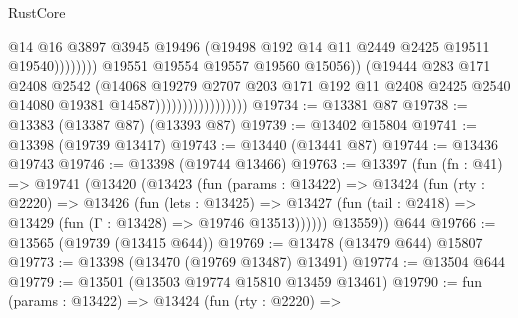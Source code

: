 \begin{lexlean}{RustCore}
\begin{coremodule}
                                                    @14
                                                    @16
                                                    @3897
                                                    @3945
                                                    @19496
                                                    (@19498
                                                      @192
                                                      @14
                                                      @11
                                                      @2449
                                                      @2425
                                                      @19511
                                                      @19540))))))))
                                      @19551
                                      @19554
                                      @19557
                                      @19560
                                      @15056))
                                  (@19444
                                    @283
                                    @171
                                    @2408
                                    @2542
                                    (@14068
                                      @19279
                                      @2707
                                      @203
                                      @171
                                      @192
                                      @11
                                      @2408
                                      @2425
                                      @2540
                                      @14080
                                      @19381
                                      @14587)))))))))))))))))
@19734 := @13381 @87
@19738 := @13383 (@13387 @87) (@13393 @87)
@19739 := @13402 @15804
@19741 := @13398 (@19739 @13417)
@19743 := @13440 (@13441 @87)
@19744 := @13436 @19743
@19746 := @13398 (@19744 @13466)
@19763 := @13397
    (fun (fn : @41) =>
    @19741
      (@13420
        (@13423
          (fun (params : @13422) =>
          @13424
            (fun (rty : @2220) =>
            @13426
              (fun (lets : @13425) =>
              @13427 (fun (tail : @2418) => @13429 (fun (Γ : @13428) => @19746 @13513))))))
        @13559))
    @644
@19766 := @13565 (@19739 (@13415 @644))
@19769 := @13478 (@13479 @644) @15807
@19773 := @13398 (@13470 (@19769 @13487) @13491)
@19774 := @13504 @644
@19779 := @13501 (@13503 @19774 @15810 @13459 @13461)
@19790 := fun (params : @13422) =>
  @13424
    (fun (rty : @2220) =>

\end{coremodule}
\end{lexlean}
